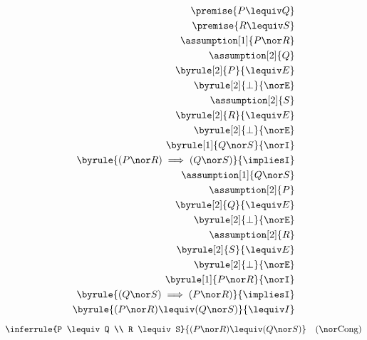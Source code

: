 \begin{align*}
    \premise{P \lequiv Q}\\
    \premise{R \lequiv S}\\
    \assumption[1]{P \nor R}\\
    \assumption[2]{Q}\\
    \byrule[2]{P}{\lequivE}\\
    \byrule[2]{\bot}{\norE}\\
    \assumption[2]{S}\\
    \byrule[2]{R}{\lequivE}\\
    \byrule[2]{\bot}{\norE}\\
    \byrule[1]{Q \nor S}{\norI}\\
    \byrule{(P \nor R) \implies (Q \nor S)}{\impliesI}\\
    \assumption[1]{Q \nor S}\\
    \assumption[2]{P}\\
    \byrule[2]{Q}{\lequivE}\\
    \byrule[2]{\bot}{\norE}\\
    \assumption[2]{R}\\
    \byrule[2]{S}{\lequivE}\\
    \byrule[2]{\bot}{\norE}\\
    \byrule[1]{P \nor R}{\norI}\\
    \byrule{(Q \nor S) \implies (P \nor R)}{\impliesI}\\
    \byrule{(P \nor R) \lequiv (Q \nor S)}{\lequivI}
\end{align*}
\newcommand{\norC}{{\nor}\text{Cong}}
\newcommand{\norD}{{\nor}\text{Cong}} %
\[\inferrule{P \lequiv Q \\ R \lequiv S}{(P \nor R) \lequiv (Q \nor S)} \quad (\norC)\]

